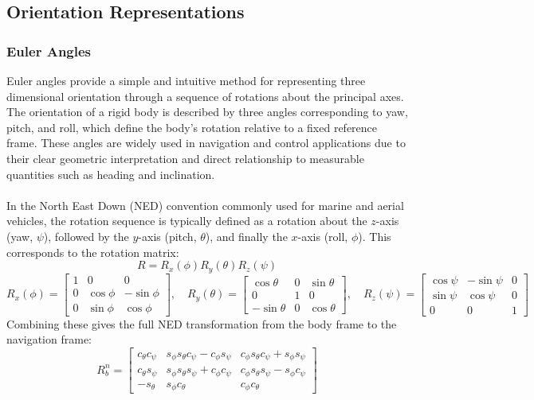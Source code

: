 \subsection{Orientation Representations}
\subsubsection{Euler Angles}
Euler angles provide a simple and intuitive method for representing three dimensional orientation through a sequence of rotations about the principal axes. The orientation of a rigid body is described by three angles corresponding to yaw, pitch, and roll, which define the body's rotation relative to a fixed reference frame. These angles are widely used in navigation and control applications due to their clear geometric interpretation and direct relationship to measurable quantities such as heading and inclination.  
\\ \\
In the North East Down (NED) convention commonly used for marine and aerial vehicles, the rotation sequence is typically defined as a rotation about the $z$-axis (yaw, $\psi$), followed by the $y$-axis (pitch, $\theta$), and finally the $x$-axis (roll, $\phi$). This corresponds to the rotation matrix:
$$
    R = R_x(\phi) R_y(\theta) R_z(\psi)
$$
$$
    R_x(\phi) =
    \begin{bmatrix}
        1 & 0 & 0 \\
        0 & \cos\phi & -\sin\phi \\
        0 & \sin\phi & \cos\phi
    \end{bmatrix}, \quad
    R_y(\theta) =
    \begin{bmatrix}
        \cos\theta & 0 & \sin\theta \\
        0 & 1 & 0 \\
        -\sin\theta & 0 & \cos\theta
    \end{bmatrix}, \quad
    R_z(\psi) =
    \begin{bmatrix}
        \cos\psi & -\sin\psi & 0 \\
        \sin\psi & \cos\psi & 0 \\
        0 & 0 & 1
    \end{bmatrix}
$$
Combining these gives the full NED transformation from the body frame to the navigation frame:
$$
    R_{b}^{n} =
    \begin{bmatrix}
        c_\theta c_\psi &
        s_\phi s_\theta c_\psi - c_\phi s_\psi &
        c_\phi s_\theta c_\psi + s_\phi s_\psi \\
        c_\theta s_\psi &
        s_\phi s_\theta s_\psi + c_\phi c_\psi &
        c_\phi s_\theta s_\psi - s_\phi c_\psi \\
        -s_\theta &
        s_\phi c_\theta &
        c_\phi c_\theta
    \end{bmatrix}
$$
